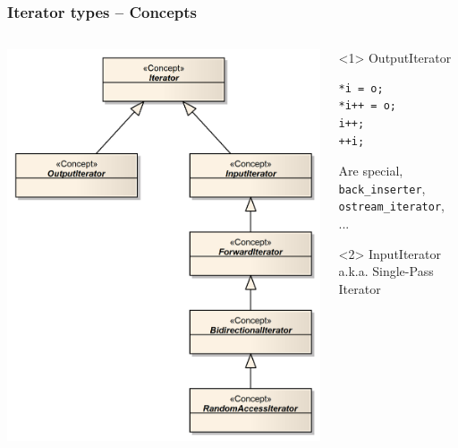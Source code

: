 \documentclass{beamer}
\newcommand{\heading}[1]{\frametitle{#1}}
\begin{document}
\begin{frame}[fragile]
  \heading{Iterator types -- Concepts}
  
  \vspace{2ex}
  
  \begin{columns}[T]
    \begin{column}{0.45\textwidth}
      \centerline{\includegraphics[width=1.0\textwidth]{IteratorsOverview}}
    \end{column}
    \begin{column}{0.55\textwidth}
      \begin{onlyenv}<1>
         OutputIterator
         
         \begin{lstlisting}
*i = o;
*i++ = o;
i++;
++i;
         \end{lstlisting}

         Are special, {\tt back\_inserter}, {\tt ostream\_iterator}, ...
      \end{onlyenv}
      \begin{onlyenv}<2>
         InputIterator a.k.a. Single-Pass Iterator
         

\end{onlyenv}
\end{column}
\end{columns}
\end{frame}
\end{document}
